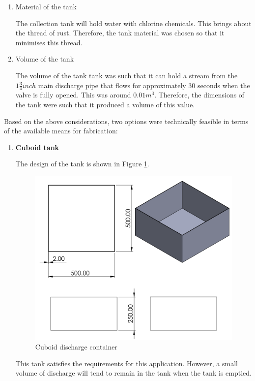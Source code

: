 \begin{itemize}
\begin{enumerate}
    \item Material of the tank
    \par
    The collection tank will hold water with chlorine chemicals. This brings about the thread of rust. Therefore, the tank material was chosen so that it minimises this thread. 
    \item Volume of the tank
    \par
    The volume of the tank tank was such that it can hold a stream from the $1 \frac{3}{4} inch$ main discharge pipe that flows for approximately 30 seconds when the valve is fully opened. This was around $0.01m^{3}$. Therefore, the dimensions of the tank were such that it produced a volume of this value.
\end{enumerate}
Based on the above considerations, two options were technically feasible in terms of the available means for fabrication:
\begin{enumerate}
    \item \textbf{Cuboid tank}
    \par
    The design of the tank is shown in Figure \ref{fig:cuboid_discharge_container}.
    \begin{figure}[H]
        \centering
        \includegraphics[height=.4\textheight]{Figures/DischargeContainer.PNG}
        \caption{Cuboid discharge container}
        \label{fig:cuboid_discharge_container}
    \end{figure}
    This tank satisfies the requirements for this application. However, a small volume of discharge will tend to remain in the tank when the tank is emptied.

\end{enumerate}
\end{itemize}
